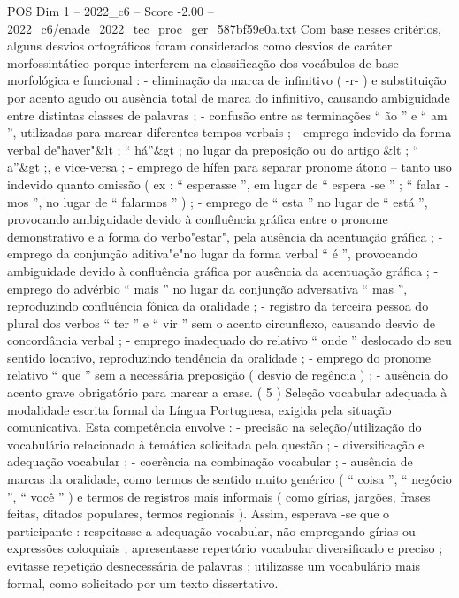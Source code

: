 \begin{textsample}{POS Dim 1 – 2022\_c6 – Score -2.00 – 2022\_c6/enade\_2022\_tec\_proc\_ger\_587bf59e0a.txt}
Com base nesses critérios, alguns desvios ortográficos foram considerados como desvios de caráter morfossintático porque interferem na classificação dos vocábulos de base morfológica e funcional : - eliminação da marca de infinitivo ( -r- ) e substituição por acento agudo ou ausência total de marca do infinitivo, causando ambiguidade entre distintas classes de palavras ; - confusão entre as terminações “ ão ” e “ am ”, utilizadas para marcar diferentes tempos verbais ; - emprego indevido da forma verbal de"haver"\&lt ; “ há”\&gt ; no lugar da preposição ou do artigo \&lt ; “ a”\&gt ;, e vice-versa ; - emprego de hífen para separar pronome átono – tanto uso indevido quanto omissão ( ex : “ esperasse ”, em lugar de “ espera -se ” ; “ falar -mos ”, no lugar de “ falarmos ” ) ; - emprego de “ esta ” no lugar de “ está ”, provocando ambiguidade devido à confluência gráfica entre o pronome demonstrativo e a forma do verbo"estar", pela ausência da acentuação gráfica ; - emprego da conjunção aditiva"e"no lugar da forma verbal “ é ”, provocando ambiguidade devido à confluência gráfica por ausência da acentuação gráfica ; - emprego do advérbio “ mais ” no lugar da conjunção adversativa “ mas ”, reproduzindo confluência fônica da oralidade ; - registro da terceira pessoa do plural dos verbos “ ter ” e “ vir ” sem o acento circunflexo, causando desvio de concordância verbal ; - emprego inadequado do relativo “ onde ” deslocado do seu sentido locativo, reproduzindo tendência da oralidade ; - emprego do pronome relativo “ que ” sem a necessária preposição ( desvio de regência ) ; - ausência do acento grave obrigatório para marcar a crase. ( 5 ) Seleção vocabular adequada à modalidade escrita formal da Língua Portuguesa, exigida pela situação comunicativa.
Esta competência envolve : - precisão na seleção/utilização do vocabulário relacionado à temática solicitada pela questão ; - diversificação e adequação vocabular ; - coerência na combinação vocabular ; - ausência de marcas da oralidade, como termos de sentido muito genérico ( “ coisa ”, “ negócio ”, “ você ” ) e termos de registros mais informais ( como gírias, jargões, frases feitas, ditados populares, termos regionais ).
Assim, esperava -se que o participante : respeitasse a adequação vocabular, não empregando gírias ou expressões coloquiais ; apresentasse repertório vocabular diversificado e preciso ; evitasse repetição desnecessária de palavras ; utilizasse um vocabulário mais formal, como solicitado por um texto dissertativo.

\end{textsample}
